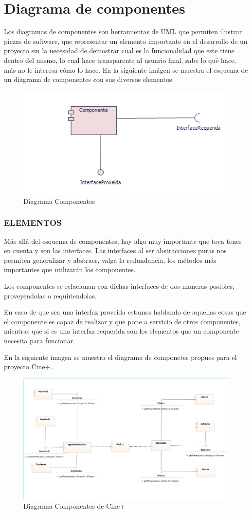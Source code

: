 \chapter{Diagrama de componentes}	
	Los diagramas de componentes son herramientas de UML que permiten ilustrar piezas de software, que representar un elemento importante en el desarrollo de un proyecto sin la necesidad de demostrar cual es la funcionalidad que este tiene dentro del mismo, lo cual hace transparente al usuario final, sabe lo qué hace, más no le interesa cómo lo hace. En la siguiente imágen se muestra el esquema de un diagrama de componentes con sus diversos elementos.
	
\begin{figure}[h!]
	\centering
	\includegraphics[scale=0.8]{diseno/componentes/imgs/comp}
	\caption{Diagrama Componentes}
\end{figure}

\subsection{ELEMENTOS}
Más allá del esquema de componentes, hay algo muy importante que toca tener en cuenta y son las interfaces. Las interfaces al ser abstracciones puras nos permiten generalizar y abstraer, valga la redundancia, los métodos más importantes que utilizarán los componentes. 

Los componentes se relacionan con dichas interfaces de dos maneras posibles, proveyendolas o requiriendolas.

En caso de que sea una interfaz  proveida estamos hablando de aquellas cosas que el componente es capaz de realizar y que pone a servicio de otros componentes, mientras que si es una interfaz requerida son los elementos que un componente necesita para funcionar.

En la siguiente imagen se muestra el diagrama de componetes propues para el proyecto Cine+.
\begin{figure}[h!]
	\centering
	\includegraphics[scale=0.8]{diseno/componentes/imgs/compCine+}
	\caption{Diagrama Componentes de Cine+}
\end{figure}